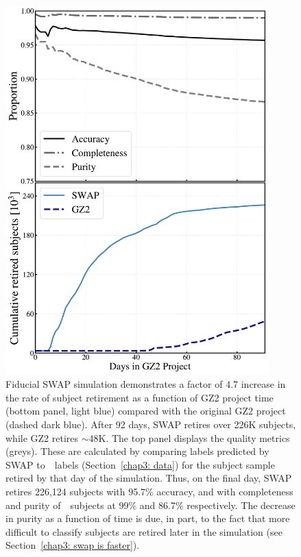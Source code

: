 \begin{figure}
\centering
\includegraphics[width=4in]{Figures/human_machine/f5.pdf}
\caption[Reprocessing GZ2 data with SWAP results in a factor of increase in the classification rate.]{Fiducial SWAP simulation demonstrates a factor of 4.7 increase in the rate of subject retirement as a function of GZ2 project time (bottom panel, light blue) compared with the original GZ2 project (dashed dark blue). After 92 days, SWAP retires over 226K subjects, while GZ2 retires $\sim$48K.  The top panel displays the quality metrics (greys). These are calculated by comparing labels predicted by SWAP to~\raw~labels (Section~\ref{chap3: data}) for the subject sample retired by that day of the simulation. Thus, on the final day, SWAP retires 226,124 subjects with 95.7\% accuracy,  and with completeness and purity of~\feat~subjects at 99\% and 86.7\% respectively. The decrease in purity as a function of time is due, in part, to the fact that more difficult to classify subjects are retired later in the simulation (see Section~\ref{chap3: swap is faster}).}
\label{fig: fiducial run}
\end{figure}


